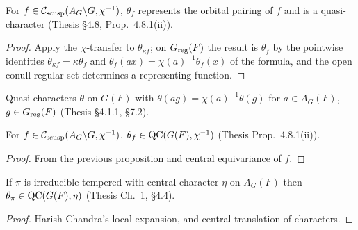 \begin{proposition}
\label{thetaF_spec}
\leanok
{}
For $f\in\mathcal{C}_{\mathrm{scusp}}(A_G\backslash G,\chi^{-1})$, $\theta_f$ represents the orbital pairing of $f$ and is a
quasi-character (Thesis \S4.8, Prop.~4.8.1(ii)).
\end{proposition}
\begin{proof}
\leanok
{}
Apply the $\chi$-transfer to $\theta_{\kappa f}$; on $G_{\mathrm{reg}}(F)$ the result is $\theta_f$ by the pointwise identities
$\theta_{\kappa f}=\kappa\theta_f$ and $\theta_f(ax)=\chi(a)^{-1}\theta_f(x)$ of the formula, and the open conull regular set
determines a representing function.
\end{proof}

\begin{definition}[$\QC(G(F),\chi^{-1})$]
\label{QC}
\leanok
{}
Quasi-characters $\theta$ on $G(F)$ with $\theta(ag)=\chi(a)^{-1}\theta(g)$ for $a\in A_G(F)$, $g\in G_{\mathrm{reg}}(F)$
(Thesis \S4.1.1, \S7.2).
\end{definition}

\begin{lemma}
\label{thetaF_mem_QC}
\leanok
{}
For $f\in\mathcal{C}_{\mathrm{scusp}}(A_G\backslash G,\chi^{-1})$, $\theta_f\in\mathrm{QC}(G(F),\chi^{-1})$ (Thesis Prop.~4.8.1(ii)).
\end{lemma}
\begin{proof}
\leanok
{}
From the previous proposition and central equivariance of $f$.
\end{proof}

\begin{lemma}
\label{charG_mem_QC}
\leanok
{}
If $\pi$ is irreducible tempered with central character $\eta$ on $A_G(F)$ then $\theta_\pi\in\mathrm{QC}(G(F),\eta)$
(Thesis Ch.~1, \S4.4).
\end{lemma}
\begin{proof}
\leanok
{}
Harish-Chandra's local expansion, and central translation of characters.
\end{proof}

